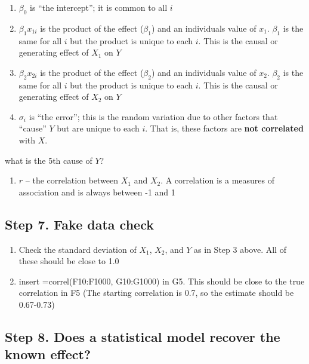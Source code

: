 \documentclass[]{book}
\providecommand{\tightlist}{%
  \setlength{\itemsep}{0pt}\setlength{\parskip}{0pt}}
\begin{document}
\begin{enumerate}
\def\labelenumi{\arabic{enumi}.}
\tightlist
\item
  \(\beta_0\) is ``the intercept''; it is common to all \(i\)
\item
  \(\beta_1 x_{1i}\) is the product of the effect (\(\beta_1\)) and an
  individuals value of \(x_1\). \(\beta_1\) is the same for all \(i\)
  but the product is unique to each \(i\). This is the causal or
  generating effect of \(X_1\) on \(Y\)
\item
  \(\beta_2 x_{2i}\) is the product of the effect (\(\beta_2\)) and an
  individuals value of \(x_2\). \(\beta_2\) is the same for all \(i\)
  but the product is unique to each \(i\). This is the causal or
  generating effect of \(X_2\) on \(Y\)
\item
  \(\sigma_i\) is ``the error''; this is the random variation due to
  other factors that ``cause'' \(Y\) but are unique to each \(i\). That
  is, these factors are \textbf{not correlated} with \(X\).
\end{enumerate}

what is the 5th cause of \(Y\)?

\begin{enumerate}
\def\labelenumi{\arabic{enumi}.}
\setcounter{enumi}{4}
\tightlist
\item
  \(r\) -- the correlation between \(X_1\) and \(X_2\). A correlation is
  a measures of association and is always between -1 and 1
\end{enumerate}

\subsection{Step 7. Fake data check}\label{step-7.-fake-data-check}

\begin{enumerate}
\def\labelenumi{\arabic{enumi}.}
\tightlist
\item
  Check the standard deviation of \(X_1\), \(X_2\), and \(Y\) as in Step
  3 above. All of these should be close to 1.0
\item
  insert =correl(F10:F1000, G10:G1000) in G5. This should be close to
  the true correlation in F5 (The starting correlation is 0.7, so the
  estimate should be 0.67-0.73)
\end{enumerate}

\subsection{Step 8. Does a statistical model recover the known
effect?}\label{step-8.-does-a-statistical-model-recover-the-known-effect}
\end{document}
